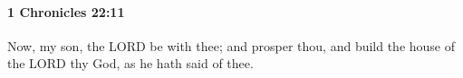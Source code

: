 
		\paragraph{1 Chronicles 22:11} %
			\label{1CHRONICLES-22-11}

			Now, my son, the LORD be with thee; and prosper thou, and build the house of the LORD thy God, as he hath said of thee.


